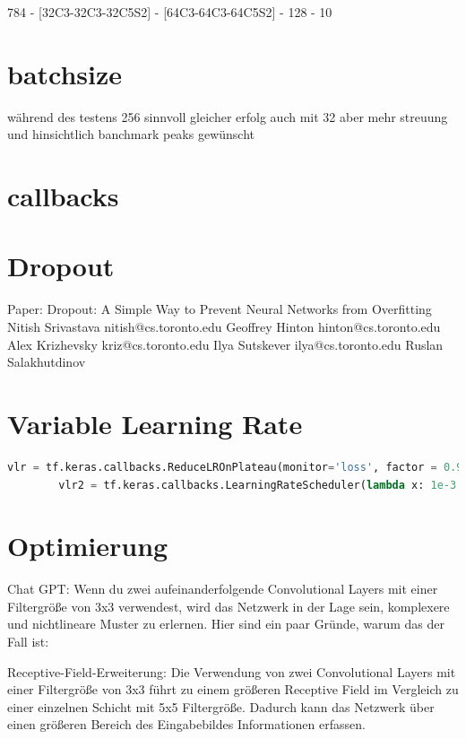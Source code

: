 \documentclass[
fontsize=12pt,					%
paper=a4,						%
twoside=true, 					%
listof=totoc, 					%
bibliography=totoc,				%
titlepage, 						%
headsepline, 					%
DIV=12,							%
BCOR=6mm,						%
cleardoublepage=empty,			%
parskip,							%
ngerman
]{scrartcl}
\begin{document}
784 - [32C3-32C3-32C5S2] - [64C3-64C3-64C5S2] - 128 - 10

\section{batchsize }

während des testens 256 sinnvoll
gleicher erfolg auch mit 32 aber mehr streuung und hinsichtlich banchmark peaks gewünscht

\section{callbacks}


\section{Dropout}

Paper:
Dropout: A Simple Way to Prevent Neural Networks from
Overfitting
Nitish Srivastava nitish@cs.toronto.edu
Geoffrey Hinton hinton@cs.toronto.edu
Alex Krizhevsky kriz@cs.toronto.edu
Ilya Sutskever ilya@cs.toronto.edu
Ruslan Salakhutdinov 

\section{Variable Learning Rate}

\begin{lstlisting}[language=Python, caption=Variable Learning-Rate, label=vlr]
		vlr = tf.keras.callbacks.ReduceLROnPlateau(monitor='loss', factor = 0.95, patience=10, min_lr=0.0001)		
		vlr2 = tf.keras.callbacks.LearningRateScheduler(lambda x: 1e-3 * 0.995 ** x)
\end{lstlisting}

\section{Optimierung}

Chat GPT:
Wenn du zwei aufeinanderfolgende Convolutional Layers mit einer Filtergröße von 3x3 verwendest, wird das Netzwerk in der Lage sein, komplexere und nichtlineare Muster zu erlernen. Hier sind ein paar Gründe, warum das der Fall ist:

Receptive-Field-Erweiterung: Die Verwendung von zwei Convolutional Layers mit einer Filtergröße von 3x3 führt zu einem größeren Receptive Field im Vergleich zu einer einzelnen Schicht mit 5x5 Filtergröße. Dadurch kann das Netzwerk über einen größeren Bereich des Eingabebildes Informationen erfassen.
\end{document}
